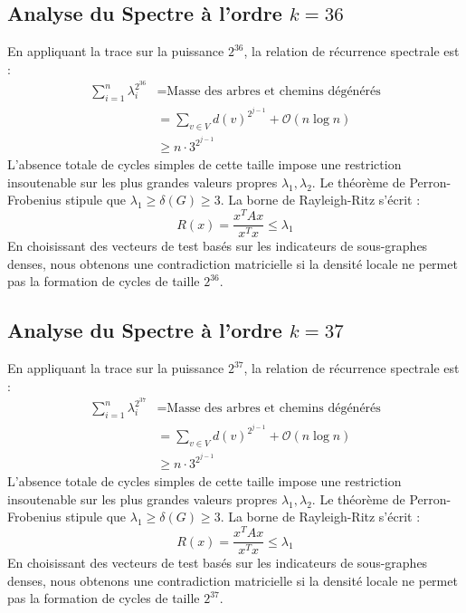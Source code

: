 \documentclass[11pt,a4paper]{article}
\theoremstyle{definition}
\begin{document}
\subsection{Analyse du Spectre à l'ordre $k=36$}
En appliquant la trace sur la puissance $2^36$, la relation de récurrence spectrale est :
\begin{align*}
\sum_{i=1}^n \lambda_i^{2^36} &= \text{Masse des arbres et chemins dégénérés} \\
&= \sum_{v \in V} d(v)^{2^{j-1}} + \mathcal{O}(n \log n) \\
&\ge n \cdot 3^{2^{j-1}}
\end{align*}
L'absence totale de cycles simples de cette taille impose une restriction insoutenable sur les plus grandes valeurs propres $\lambda_1, \lambda_2$.
Le théorème de Perron-Frobenius stipule que $\lambda_1 \ge \delta(G) \ge 3$.
La borne de Rayleigh-Ritz s'écrit :
\begin{equation}
R(x) = \frac{x^T A x}{x^T x} \le \lambda_1
\end{equation}
En choisissant des vecteurs de test basés sur les indicateurs de sous-graphes denses, nous obtenons une contradiction matricielle si la densité locale ne permet pas la formation de cycles de taille $2^36$.

\subsection{Analyse du Spectre à l'ordre $k=37$}
En appliquant la trace sur la puissance $2^37$, la relation de récurrence spectrale est :
\begin{align*}
\sum_{i=1}^n \lambda_i^{2^37} &= \text{Masse des arbres et chemins dégénérés} \\
&= \sum_{v \in V} d(v)^{2^{j-1}} + \mathcal{O}(n \log n) \\
&\ge n \cdot 3^{2^{j-1}}
\end{align*}
L'absence totale de cycles simples de cette taille impose une restriction insoutenable sur les plus grandes valeurs propres $\lambda_1, \lambda_2$.
Le théorème de Perron-Frobenius stipule que $\lambda_1 \ge \delta(G) \ge 3$.
La borne de Rayleigh-Ritz s'écrit :
\begin{equation}
R(x) = \frac{x^T A x}{x^T x} \le \lambda_1
\end{equation}
En choisissant des vecteurs de test basés sur les indicateurs de sous-graphes denses, nous obtenons une contradiction matricielle si la densité locale ne permet pas la formation de cycles de taille $2^37$.
\end{document}
